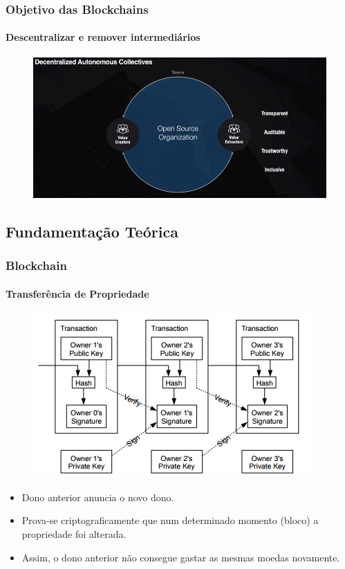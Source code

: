 \documentclass[11pt, red]{beamer}
\begin{document}
\begin{frame}
    \frametitle{Objetivo das Blockchains}
    \framesubtitle{Descentralizar e remover intermedi\'arios}
    \begin{figure}[htb]\label{ex1}
        \begin{center}
            \includegraphics[width=1\linewidth]{fig/dac.png}
        \end{center}
    \end{figure}
\end{frame}

\subsection[Fundamenta\c{c}\~{a}o Te\'{o}rica]{Fundamenta\c{c}\~{a}o Te\'{o}rica}

\begin{frame}
    \frametitle{Blockchain}
    \framesubtitle{Transfer\^encia de Propriedade}
    \begin{figure}[htb]\label{ex1}
        \begin{center}
            \includegraphics[width=0.5\linewidth]{fig/btc1.png}
        \end{center}
    \end{figure}
    \begin{beamerboxesrounded}[lower=fundocinza,shadow=true]{}
        \begin{itemize}
        	\item Dono anterior anuncia o novo dono.
            \item Prova-se criptograficamente que num determinado momento (bloco) a propriedade foi alterada.
            \item Assim, o dono anterior n\~ao consegue gastar as mesmas moedas novamente.
        \end{itemize}
    \end{beamerboxesrounded}
\end{frame}
\end{document}

